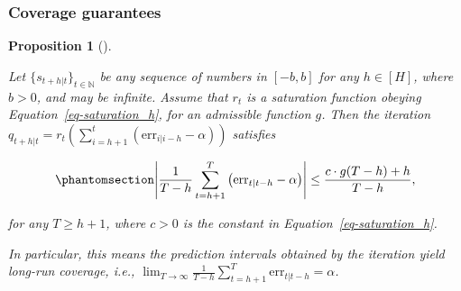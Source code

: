 \documentclass[
  11pt,
  a4paper,
]{article}
\theoremstyle{plain}
\theoremstyle{plain}
\newtheorem{proposition}{Proposition}[section]
\theoremstyle{remark}
\begin{document}
\subsubsection{Coverage guarantees}\label{coverage-guarantees}

\begin{proposition}[]\protect\hypertarget{prp-cov_rt}{}\label{prp-cov_rt}

Let \(\{s_{t+h|t}\}_{t\in\mathbb{N}}\) be any sequence of numbers in
\([-b, b]\) for any \(h\in[H]\), where \(b>0\), and may be infinite.
Assume that \(r_t\) is a saturation function obeying
Equation~\ref{eq-saturation_h}, for an admissible function \(g\). Then
the iteration
\(q_{t+h|t}=r_t\left(\sum_{i=h+1}^t\left(\mathrm{err}_{i|i-h}-\alpha\right)\right)\)
satisfies

\begin{equation}\phantomsection\label{eq-cov_rt}{
\left|\frac{1}{T-h}\sum_{t=h+1}^{T}\left(\mathrm{err}_{t|t-h}-\alpha\right)\right| \leq \frac{c \cdot g(T-h) + h}{T-h},
}\end{equation}

for any \(T \geq h+1\), where \(c>0\) is the constant in
Equation~\ref{eq-saturation_h}.

In particular, this means the prediction intervals obtained by the
iteration yield long-run coverage, i.e.,
\(\lim _{T \rightarrow \infty} \frac{1}{T-h} \sum_{t=h+1}^T \mathrm{err}_{t|t-h} = \alpha\).

\end{proposition}
\end{document}
